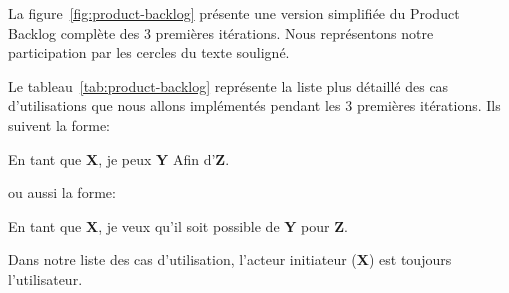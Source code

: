 La figure~\ref{fig:product-backlog} présente une version simplifiée du Product
Backlog complète des 3 premières itérations. Nous représentons notre
participation par les cercles du texte souligné.



Le tableau~\ref{tab:product-backlog} représente la liste plus détaillé des cas
d'utilisations que nous allons implémentés pendant les 3 premières itérations.
Ils suivent la forme:
\begin{displayquote}
    En tant que \textbf{X}, je peux \textbf{Y} Afin d'\textbf{Z}.
\end{displayquote}
ou aussi la forme:
\begin{displayquote}
    En tant que \textbf{X}, je veux qu'il soit possible de \textbf{Y} pour
    \textbf{Z}.
\end{displayquote}

Dans notre liste des cas d'utilisation, l'acteur initiateur (\textbf{X}) est
toujours l'utilisateur.

